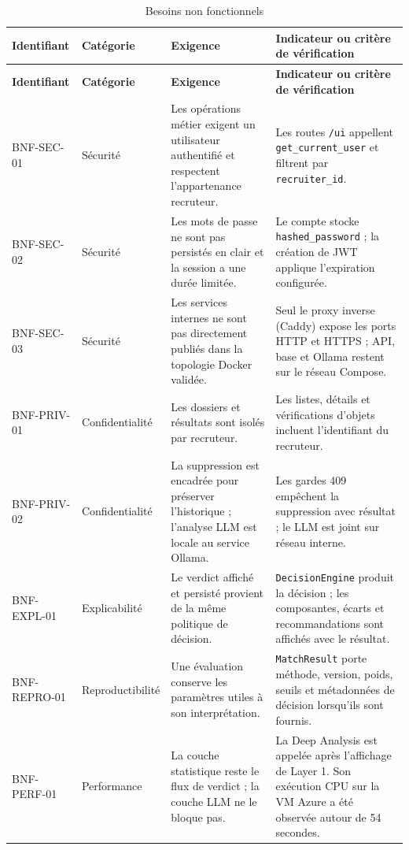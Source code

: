 {\footnotesize\setlength{\tabcolsep}{2pt}
\begin{longtable}{|>{\raggedright\arraybackslash\scriptsize}p{2.15cm}|>{\raggedright\arraybackslash}p{2.15cm}|>{\raggedright\arraybackslash}p{5.3cm}|>{\raggedright\arraybackslash}p{3.65cm}|}
\caption{Besoins non fonctionnels}\label{tab:besoins-non-fonctionnels}\\
\hline
\textbf{Identifiant} & \textbf{Catégorie} & \textbf{Exigence} & \textbf{Indicateur ou critère de vérification}\\
\hline
\endfirsthead
\hline
\textbf{Identifiant} & \textbf{Catégorie} & \textbf{Exigence} & \textbf{Indicateur ou critère de vérification}\\
\hline
\endhead
BNF-SEC-01 & Sécurité & Les opérations métier exigent un utilisateur authentifié et respectent l'appartenance recruteur. & Les routes \texttt{/ui} appellent \texttt{get\_current\_user} et filtrent par \texttt{recruiter\_id}.\\
\hline
BNF-SEC-02 & Sécurité & Les mots de passe ne sont pas persistés en clair et la session a une durée limitée. & Le compte stocke \texttt{hashed\_password} ; la création de JWT applique l'expiration configurée.\\
\hline
BNF-SEC-03 & Sécurité & Les services internes ne sont pas directement publiés dans la topologie Docker validée. & Seul le proxy inverse (Caddy) expose les ports HTTP et HTTPS ; API, base et Ollama restent sur le réseau Compose.\\
\hline
BNF-PRIV-01 & Confidentialité & Les dossiers et résultats sont isolés par recruteur. & Les listes, détails et vérifications d'objets incluent l'identifiant du recruteur.\\
\hline
BNF-PRIV-02 & Confidentialité & La suppression est encadrée pour préserver l'historique ; l'analyse LLM est locale au service Ollama. & Les gardes 409 empêchent la suppression avec résultat ; le LLM est joint sur réseau interne.\\
\hline
BNF-EXPL-01 & Explicabilité & Le verdict affiché et persisté provient de la même politique de décision. & \texttt{DecisionEngine} produit la décision ; les composantes, écarts et recommandations sont affichés avec le résultat.\\
\hline
BNF-REPRO-01 & Reproductibilité & Une évaluation conserve les paramètres utiles à son interprétation. & \texttt{MatchResult} porte méthode, version, poids, seuils et métadonnées de décision lorsqu'ils sont fournis.\\
\hline
BNF-PERF-01 & Performance & La couche statistique reste le flux de verdict ; la couche LLM ne le bloque pas. & La Deep Analysis est appelée après l'affichage de Layer 1. Son exécution CPU sur la VM Azure a été observée autour de 54 secondes.\\

\end{longtable}}
